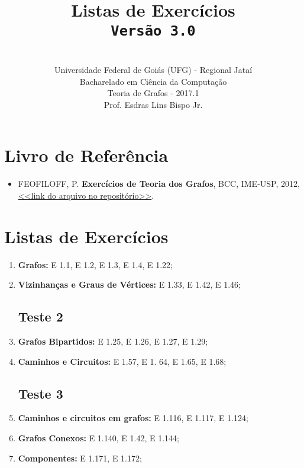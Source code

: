\documentclass[12pt,a4paper,oneside]{article}
\author{\\Universidade Federal de Goiás (UFG) - Regional Jataí\\Bacharelado em Ciência da Computação \\Teoria de Grafos - 2017.1 \\Prof. Esdras Lins Bispo Jr.}
\date{}
\title{
	\sc \huge Listas de Exercícios 
	\\{\tt Versão 3.0}
}
\begin{document}
\maketitle

\section{Livro de Referência}
	\begin{itemize}
		\item FEOFILOFF, P. {\bf Exercícios de Teoria dos Grafos}, BCC, IME-USP, 2012, \href{https://github.com/bispojr/grafos/raw/master/2017.1/arquivos/exercicios-grafos.pdf}{<<link do arquivo no repositório>>}.
	\end{itemize}
	
\section{Listas de Exercícios}

\begin{enumerate}

	\subsection{Teste 1}
	\item[] {\bf Grafos:} E 1.1, E 1.2, E 1.3, E 1.4, E 1.22;
	\item[] {\bf Vizinhanças e Graus de Vértices:} E 1.33, E 1.42, E 1.46;
	\subsection{Teste 2}
	\item[] {\bf Grafos Bipartidos:} E 1.25, E 1.26, E 1.27, E 1.29;
	\item[] {\bf Caminhos e Circuitos:} E 1.57,	E 1. 64, E 1.65,	E 1.68;
	\subsection{Teste 3}
	\item[] {\bf Caminhos e circuitos em grafos:} E 1.116,	E 1.117, E 1.124;
	\item[] {\bf Grafos Conexos:} E 1.140, E 1.42, E 1.144;
	\item[] {\bf Componentes:} E 1.171, E 1.172;

\end{enumerate}
\end{document}
